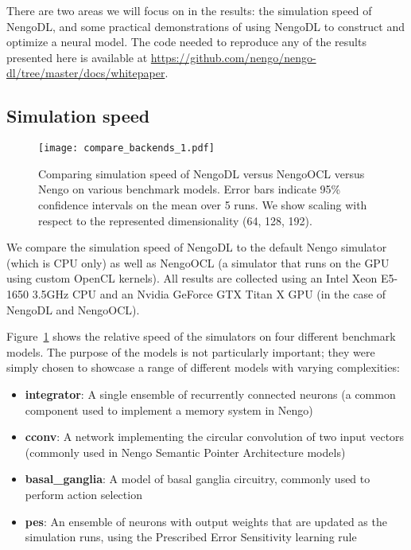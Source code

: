 \documentclass{article}
\begin{document}
There are two areas we will focus on in the results: the simulation speed of NengoDL, and some practical demonstrations of using NengoDL to construct and optimize a neural model.  The code needed to reproduce any of the results presented here is available at \url{https://github.com/nengo/nengo-dl/tree/master/docs/whitepaper}. 

\subsection{Simulation speed}

\begin{figure}
\centering
\texttt{[image: compare\_backends\_1.pdf]}
\caption{Comparing simulation speed of NengoDL versus NengoOCL versus Nengo on various benchmark models.  Error bars indicate 95\% confidence intervals on the mean over 5 runs.  We show scaling with respect to the represented dimensionality (64, 128, 192).}
\label{fig:compare_backends_1}
\end{figure}

We compare the simulation speed of NengoDL to the default Nengo simulator (which is CPU only) as well as NengoOCL (a simulator that runs on the GPU using custom OpenCL kernels).  All results are collected using an Intel Xeon E5-1650 3.5GHz CPU and an Nvidia GeForce GTX Titan X GPU (in the case of NengoDL and NengoOCL).

Figure~\ref{fig:compare_backends_1} shows the relative speed of the simulators on four different benchmark models.  The purpose of the models is not particularly important; they were simply chosen to showcase a range of different models with varying complexities:

\begin{itemize}
\item {\bf integrator}: A single ensemble of recurrently connected neurons (a common component used to implement a memory system in Nengo)
\item {\bf cconv}: A network implementing the circular convolution of two input vectors (commonly used in Nengo Semantic Pointer Architecture models)
\item {\bf basal\_ganglia}: A model of basal ganglia circuitry, commonly used to perform action selection
\item {\bf pes}: An ensemble of neurons with output weights that are updated as the simulation runs, using the Prescribed Error Sensitivity learning rule \citep{MacNeil2011}
\end{itemize}
\end{document}
